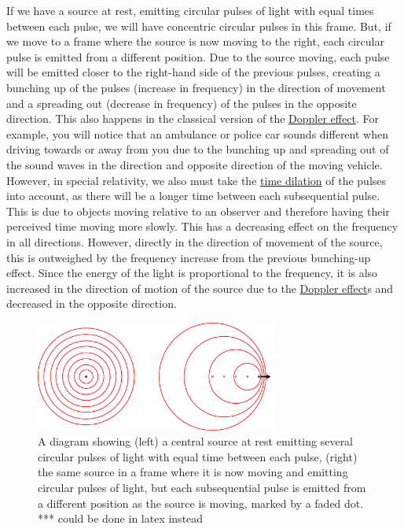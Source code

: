If we have a source at rest, emitting circular pulses of light with equal times between each pulse, we will have concentric circular pulses in this frame.
But, if we move to a frame where the source is now moving to the right, each circular pulse is emitted from a different position.
Due to the source moving, each pulse will be emitted closer to the right-hand side of the previous pulses, creating a bunching up of the pulses (increase in frequency) in the direction of movement and a spreading out (decrease in frequency) of the pulses in the opposite direction.
This also happens in the classical version of the \hyperlink{def-doppler-effect}{Doppler effect}.
For example, you will notice that an ambulance or police car sounds different when driving towards or away from you due to the bunching up and spreading out of the sound waves in the direction and opposite direction of the moving vehicle.
However, in special relativity, we also must take the \hyperlink{def-time-dilation}{time dilation} of the pulses into account, as there will be a longer time between each subsequential pulse.
This is due to objects moving relative to an observer and therefore having their perceived time moving more slowly.
This has a decreasing effect on the frequency in all directions.
However, directly in the direction of movement of the source, this is outweighed by the frequency increase from the previous bunching-up effect.
Since the energy of the light is proportional to the frequency, it is also increased in the direction of motion of the source due to the \hyperlink{def-doppler-effect}{Doppler effect}s and decreased in the opposite direction.

\begin{figure}[H]
	\centering
	\includegraphics[width = 8cm]{images/pdf/Doppler.pdf}
	\caption{A diagram showing (left) a central source at rest emitting several circular pulses of light with equal time between each pulse, (right) the same source in a frame where it is now moving and emitting circular pulses of light, but each subsequential pulse is emitted from a different position as the source is moving, marked by a faded dot. *** could be done in latex instead}
	\label{fig: doppler effect intro}
\end{figure}

